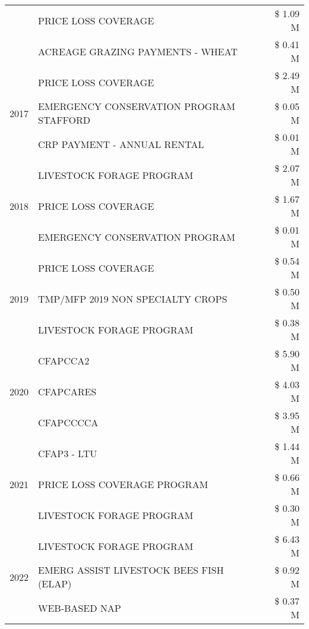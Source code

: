 \begin{tabular}{llr}
 & PRICE LOSS COVERAGE & \$ 1.09 M \\
 & ACREAGE GRAZING PAYMENTS - WHEAT & \$ 0.41 M \\
\cline{1-3}
\multirow[t]{3}{*}{2017} & PRICE LOSS COVERAGE & \$ 2.49 M \\
 & EMERGENCY CONSERVATION PROGRAM STAFFORD & \$ 0.05 M \\
 & CRP PAYMENT - ANNUAL RENTAL & \$ 0.01 M \\
\cline{1-3}
\multirow[t]{3}{*}{2018} & LIVESTOCK FORAGE PROGRAM & \$ 2.07 M \\
 & PRICE LOSS COVERAGE & \$ 1.67 M \\
 & EMERGENCY CONSERVATION PROGRAM & \$ 0.01 M \\
\cline{1-3}
\multirow[t]{3}{*}{2019} & PRICE LOSS COVERAGE & \$ 0.54 M \\
 & TMP/MFP 2019 NON SPECIALTY CROPS & \$ 0.50 M \\
 & LIVESTOCK FORAGE PROGRAM & \$ 0.38 M \\
\cline{1-3}
\multirow[t]{3}{*}{2020} & CFAPCCA2 & \$ 5.90 M \\
 & CFAPCARES & \$ 4.03 M \\
 & CFAPCCCCA & \$ 3.95 M \\
\cline{1-3}
\multirow[t]{3}{*}{2021} & CFAP3 - LTU & \$ 1.44 M \\
 & PRICE LOSS COVERAGE PROGRAM & \$ 0.66 M \\
 & LIVESTOCK FORAGE PROGRAM & \$ 0.30 M \\
\cline{1-3}
\multirow[t]{3}{*}{2022} & LIVESTOCK FORAGE PROGRAM & \$ 6.43 M \\
 & EMERG ASSIST LIVESTOCK BEES FISH (ELAP) & \$ 0.92 M \\
 & WEB-BASED NAP & \$ 0.37 M \\
\cline{1-3}
\bottomrule
\end{tabular}

